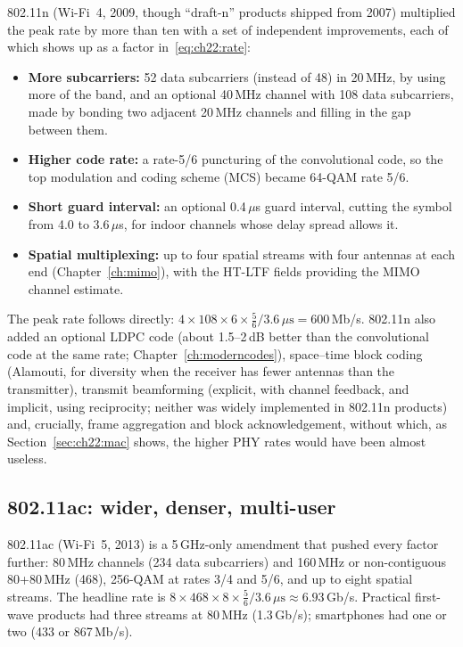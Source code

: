 802.11n (Wi-Fi~4, 2009, though ``draft-n'' products shipped from 2007) multiplied the peak rate by
more than ten with a set of independent improvements, each of which shows up as a factor
in~\eqref{eq:ch22:rate}:
\begin{itemize}
\item \textbf{More subcarriers:} 52 data subcarriers (instead of 48) in 20\,MHz, by using more of the
band, and an optional 40\,MHz channel with 108 data subcarriers, made by bonding two adjacent
20\,MHz channels and filling in the gap between them.
\item \textbf{Higher code rate:} a rate-5/6 puncturing of the convolutional code, so the top
modulation and coding scheme (MCS) became 64-QAM rate 5/6.
\item \textbf{Short guard interval:} an optional 0.4\,$\mu$s guard interval, cutting the symbol from
4.0 to 3.6\,$\mu$s, for indoor channels whose delay spread allows it.
\item \textbf{Spatial multiplexing:} up to four spatial streams with four antennas at each end
(Chapter~\ref{ch:mimo}), with the HT-LTF fields providing the MIMO channel estimate.
\end{itemize}
The peak rate follows directly: $4\times108\times6\times\tfrac56/3.6\,\mu\text{s}=600$\,Mb/s.
802.11n also added an optional LDPC code (about 1.5--2\,dB better than the convolutional code at
the same rate; Chapter~\ref{ch:moderncodes}), space--time block coding (Alamouti, for diversity when
the receiver has fewer antennas than the transmitter), transmit beamforming (explicit, with channel
feedback, and implicit, using reciprocity; neither was widely implemented in 802.11n products) and,
crucially, frame aggregation and block acknowledgement, without which, as
Section~\ref{sec:ch22:mac} shows, the higher PHY rates would have been almost useless.


\subsection{802.11ac: wider, denser, multi-user}

802.11ac (Wi-Fi~5, 2013) is a 5\,GHz-only amendment that pushed every factor further: 80\,MHz
channels (234 data subcarriers) and 160\,MHz or non-contiguous 80+80\,MHz (468), 256-QAM at rates
3/4 and 5/6, and up to eight spatial streams. The headline rate is
$8\times468\times8\times\tfrac56/3.6\,\mu\text{s}\approx6.93$\,Gb/s. Practical first-wave products had
three streams at 80\,MHz (1.3\,Gb/s); smartphones had one or two (433 or 867\,Mb/s).

